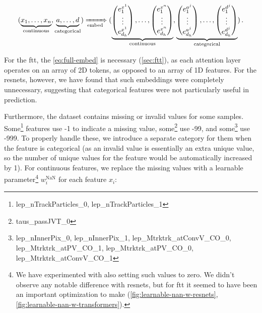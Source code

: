 \begin{equation}
    \label{eq:full-embed}
    (\underbrace{x_1, \dots, x_n}_\text{continuous},
    \underbrace{a, \dots, d}_\text{categorical})
    \xRightarrow[\text{embed}]{}
    (\underbrace{\begin{pmatrix}
            e^{x^1}_1 \\ \vdots \\ e^{x^1}_{d_h}
        \end{pmatrix}, \dots,
        \begin{pmatrix}
            e^{x^n}_1 \\ \vdots \\ e^{x^n}_{d_h}
        \end{pmatrix}}_\text{continuous},
    \underbrace{\begin{pmatrix}
            e^{a^j}_1 \\ \vdots \\ e^{a^j}_{d_h}
        \end{pmatrix}, \dots,
        \begin{pmatrix}
            e^{d^j}_1 \\ \vdots \\ e^{d^j}_{d_h}
        \end{pmatrix}}_\text{categorical})\,.
\end{equation}

For the \gls{ftt}, the \autoref{eq:full-embed} is necessary (\autoref{sec:ftt}), as each attention layer operates
on an array of 2D tokens, as opposed to an array of 1D features. For the \glspl{resnet}, however, we have found that
such embeddings were completely unnecessary, suggesting that categorical features were not particularly useful in
prediction.

Furthermore, the dataset contains missing or invalid values for some samples.  Some\footnote{lep\_nTrackParticles\_0,
    lep\_nTrackParticles\_1} features use -1 to indicate a missing value, some\footnote{taus\_passJVT\_0} use -99, and
some\footnote{lep\_nInnerPix\_0, lep\_nInnerPix\_1, lep\_Mtrktrk\_atConvV\_CO\_0, lep\_Mtrktrk\_atPV\_CO\_1,
    lep\_Mtrktrk\_atPV\_CO\_0, lep\_Mtrktrk\_atConvV\_CO\_1} use -999. To properly handle these, we introduce a separate
category for them when the feature is categorical (as an invalid value is essentially an extra unique value, so the
number of unique values for the feature would be automatically increased by 1). For continuous features, we replace the
missing values with a learnable parameter\footnote{We have experimented with also setting such values to zero. We didn't
    observe any notable difference with \glspl{resnet}, but for \gls{ftt} it seemed to have been an important
    optimization to make (\autoref{fig:learnable-nan-w-resnets}, \autoref{fig:learnable-nan-w-transformers}).}
$w^\text{NaN}_i$ for each feature $x_i$:

